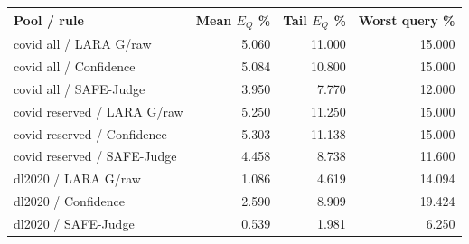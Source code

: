\begin{tabular}{@{}lrrr@{}}
\toprule
Pool / rule & Mean $E_Q$ \% & Tail $E_Q$ \% & Worst query \% \\
\midrule
covid all / LARA G/raw & 5.060 & 11.000 & 15.000 \\
covid all / Confidence & 5.084 & 10.800 & 15.000 \\
covid all / SAFE-Judge & 3.950 & 7.770 & 12.000 \\
covid reserved / LARA G/raw & 5.250 & 11.250 & 15.000 \\
covid reserved / Confidence & 5.303 & 11.138 & 15.000 \\
covid reserved / SAFE-Judge & 4.458 & 8.738 & 11.600 \\
dl2020 / LARA G/raw & 1.086 & 4.619 & 14.094 \\
dl2020 / Confidence & 2.590 & 8.909 & 19.424 \\
dl2020 / SAFE-Judge & 0.539 & 1.981 & 6.250 \\
\bottomrule
\end{tabular}

